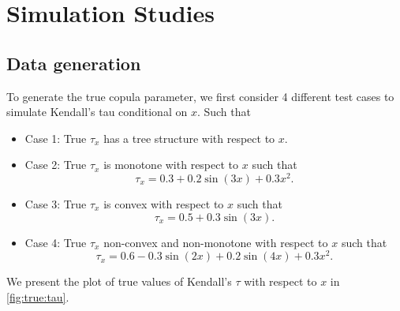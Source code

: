 \documentclass{amsart}
\begin{document}
\section{Simulation Studies}

\subsection{Data generation}

To generate the true copula parameter, we first consider 4 different test cases to simulate Kendall's tau conditional on $x$. Such that
 
\begin{itemize}
    \item Case 1: True $\tau_x$ has a tree structure with respect to $x$.
    \item Case 2: True $\tau_x$ is monotone with respect to $x$ such that 
    \begin{equation}\label{eq:synth:tau_x:case2}
        \tau_x = 0.3 + 0.2 \sin(3x) + 0.3x^2.
    \end{equation}
    \item Case 3: True $\tau_x$ is convex with respect to $x$ such that 
    \begin{equation}\label{eq:synth:tau_x:case3}
        \tau_x = 0.5 + 0.3 \sin(3x).
    \end{equation}
    \item Case 4: True $\tau_x$ non-convex and non-monotone with respect to $x$ such that 
    \begin{equation}\label{eq:synth:tau_x:case4}
        \tau_x = 0.6 - 0.3 \sin(2x) + 0.2 \sin(4x) + 0.3 x^2.
    \end{equation}
\end{itemize}

We present the plot of true values of Kendall's $\tau$ with respect to $x$ in \cref{fig:true:tau}.
\end{document}
